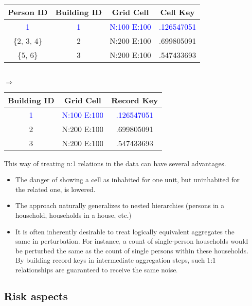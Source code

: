 \begin{table}[H]
    \centering
    \begin{tabular}{| c | c | c | c |}
    \hline
        Person ID & Building ID & Grid Cell & Cell Key \\
    \hline
            \textcolor{blue}{1} & \textcolor{blue}{1} & \textcolor{blue}{N:100 E:100} & \textcolor{blue}{.126547051} \\
    \hline
      \{2, 3, 4\} &   2      &     N:200 E:100     & .699805091\\
    \hline
      \{5, 6\}    &   3      &     N:200 E:100     & .547433693 \\
    \hline
    \end{tabular}\\ \vspace{10pt}
    $\Rightarrow$ \quad
    \begin{tabular}{| c | c | c |}
    \hline
        Building ID & Grid Cell & Record Key \\
    \hline
          \textcolor{blue}{1} & \textcolor{blue}{N:100 E:100}  & \textcolor{blue}{.126547051} \\
    \hline
          2      &    N:200 E:100      & .699805091 \\
    \hline
          3      &    N:200 E:100      & .547433693 \\
    \hline
    \end{tabular}
\end{table}

This way of treating n:1 relations in the data can have several advantages. 
\begin{itemize}
    \item The danger of showing a cell as inhabited for one unit, but uninhabited for the related one, is lowered.
    \item The approach naturally generalizes to nested hierarchies (persons in a household, households in a house, etc.)
    \item It is often inherently desirable to treat logically equivalent aggregates the same in perturbation. For instance, a count of single-person households would be perturbed the same as the count of single persons within these households. By building record keys in intermediate aggregation steps, such 1:1 relationships are guaranteed to receive the same noise.
\end{itemize}  

\subsection{Risk aspects} \label{sec:ckm_risk}

